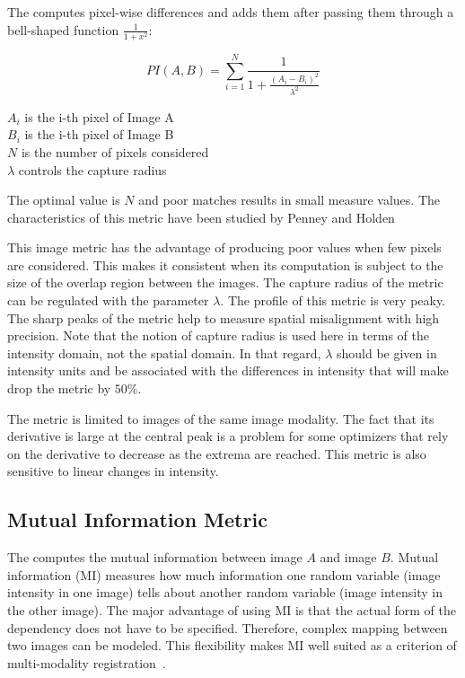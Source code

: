 The  computes
pixel-wise differences and adds them after passing them through a bell-shaped
function $\frac{1}{1+x^2}$:

\begin{equation}
PI(A,B) =  \sum_{i=1}^N \frac{ 1 }{ 1 + \frac{ \left( A_i - B_i \right) ^ 2}{ \lambda^2 }  }
\end{equation}
\begin{center}
$A_i$ is the i-th pixel of Image A \\
$B_i$ is the i-th pixel of Image B \\
$N$ is the number of pixels considered \\
$\lambda$ controls the capture radius
\end{center}

The optimal value is $N$ and poor matches results in small measure values.
The characteristics of this metric have been studied by Penney and Holden
\cite{Holden1999}\cite{Penney1998}

This image metric has the advantage of producing poor values when few pixels
are considered.  This makes it consistent when its computation is subject to
the size of the overlap region between the images. The capture radius of the
metric can be regulated with the parameter $\lambda$.  The profile of this
metric is very peaky. The sharp peaks of the metric help to measure spatial
misalignment with high precision. Note that the notion of capture radius is
used here in terms of the intensity domain, not the spatial domain. In that
regard, $\lambda$ should be given in intensity units and be associated with
the differences in intensity that will make drop the metric by $50\%$.

The metric is limited to images of the same image modality.  The
fact that its derivative is large at the central peak is a problem for some
optimizers that rely on the derivative to decrease as the extrema are
reached.  This metric is also sensitive to linear changes in intensity.


\subsection{Mutual Information Metric}
\label{sec:MutualInformationMetric}

The  computes the mutual
information between image $A$ and image $B$.  Mutual information (MI)
measures how much information one random variable (image intensity in one
image) tells about another random variable (image intensity in the other
image). The major advantage of using MI is that the actual form of the
dependency does not have to be specified.  Therefore, complex mapping between
two images can be modeled.  This flexibility makes MI well suited as a
criterion of multi-modality registration~\cite{Pluim2003}.

